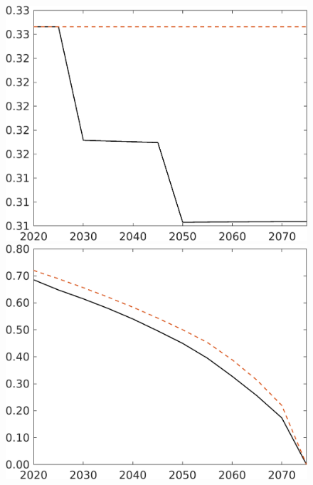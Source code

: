 \begin{figure}[h!!]
\begin{minipage}[]{0.32\textwidth}
\end{minipage}
	\begin{minipage}[]{0.32\textwidth}
	\includegraphics[width=1\textwidth]{../../codding_model/own_basedOnFried/optimalPol_190722_tidiedUp/figures/all_July22/hl_TargetCompSP_T_spillover0_noskill0_sep1_xgrowth0_etaa0.79_lgd0.png}
\end{minipage}
	\begin{minipage}[]{0.32\textwidth}
	\includegraphics[width=1\textwidth]{../../codding_model/own_basedOnFried/optimalPol_190722_tidiedUp/figures/all_July22/gAagg_TargetCompSP_T_spillover0_noskill0_sep1_xgrowth0_etaa0.79_lgd0.png}

\end{minipage}
\end{figure}
